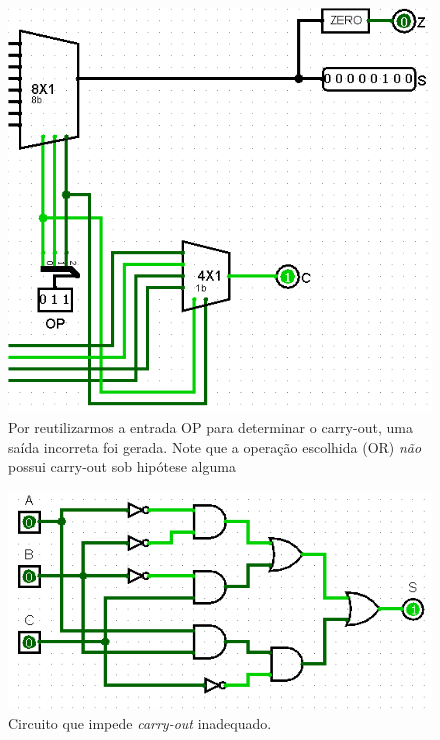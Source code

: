 \documentclass[
	12pt,				%
	openright,			%
	twoside,			%
	a4paper,			%
	english,			%
	french,				%
	spanish,			%
	brazil,				%
	]{abntex2}
\begin{document}
\begin{figure}[H]
	\begin{center}
	    \includegraphics[scale=0.5]{imagens/carryoutincorreto.png}
	\end{center}
\caption{\label{carryoutincorreto}Por reutilizarmos a entrada OP para determinar o carry-out, uma saída incorreta foi gerada. Note que a operação escolhida (OR) \textit{não} possui carry-out sob hipótese alguma}
\end{figure}

\begin{figure}[H]
	\begin{center}
	    \includegraphics[scale=0.5]{imagens/validacout.png}
	\end{center}
\caption{\label{validacout}Circuito que impede \textit{carry-out} inadequado.}
\end{figure}
\end{document}

